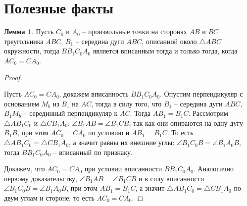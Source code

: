 \documentclass[12pt]{article}
\theoremstyle{definition}
\newtheorem{lemma}[theorem]{Лемма}
\begin{document}
    \section{Полезные факты}
    \begin{lemma}
        Пусть $C_0$ и $A_0$ -- произвольные точки на сторонах $AB$ и $BC$ треугольника $ABC$, $B_1$ -- середина дуги $ABC$, описанной около $\triangle ABC$ окружности, тогда $BB_1C_0A_0$ является вписанным тогда и только тогда, когда $AC_0=CA_0$. 
    \end{lemma}
    \begin{proof}
        $ $\newline
        \begin{center}
        \end{center}
        Пусть $AC_0=CA_0$, докажем вписанность $BB_1C_0A_0$. Опустим перпендикуляр с основанием $M_b$ из $B_1$ на $AC$, тогда в силу того, что $B_1$ -- середина дуги $ABC$, $B_1M_b$ -- серединный перпендикуляр к $AC$. Тогда $AB_1=B_1C$. Рассмотрим $\triangle AB_1C_0$ и $\triangle CB_1A_0$: $\angle B_1AB=\angle B_1CB$, так как они опираются на одну дугу $B_1B$, при этом $AC_0=CA_0$ по условию и $AB_1=B_1C$. То есть $\triangle AB_1C_0=\triangle CB_1A_0$, а значит равны их внешние углы: $\angle B_1C_0B=\angle B_1A_0B$, тогда $BB_1C_0A_0$ -- вписанный по признаку.\bigskip

        Докажем, что $AC_0=CA_0$ при условии вписанности $BB_1C_0A_0$. Аналогично первому доказательству, $\angle B_1AB=\angle B_1CB$ и в силу вписанности $\angle B_1C_0B=\angle B_1A_0B$, при этом $AB_1=B_1C$, а значит $\triangle AB_1C_0=\triangle CB_1A_0$ по двум углам и стороне, то есть $AC_0=CA_0$.
    \end{proof}
\end{document}

